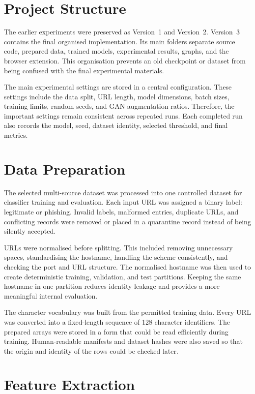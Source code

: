 \section{Project Structure}

The earlier experiments were preserved as Version~1 and Version~2. Version~3
contains the final organised implementation. Its main folders separate source
code, prepared data, trained models, experimental results, graphs, and the
browser extension. This organisation prevents an old checkpoint or dataset
from being confused with the final experimental materials.

The main experimental settings are stored in a central configuration. These
settings include the data split, URL length, model dimensions, batch sizes,
training limits, random seeds, and GAN augmentation ratios. Therefore, the
important settings remain consistent across repeated runs. Each completed run
also records the model, seed, dataset identity, selected threshold, and final
metrics.

\section{Data Preparation}

The selected multi-source dataset was processed into one controlled dataset for
classifier training and evaluation. Each input URL was assigned a binary label:
legitimate or phishing. Invalid labels, malformed entries, duplicate URLs, and
conflicting records were removed or placed in a quarantine record instead of
being silently accepted.

URLs were normalised before splitting. This included removing unnecessary
spaces, standardising the hostname, handling the scheme consistently, and
checking the port and URL structure. The normalised hostname was then used to
create deterministic training, validation, and test partitions. Keeping the
same hostname in one partition reduces identity leakage and provides a more
meaningful internal evaluation.

The character vocabulary was built from the permitted training data. Every URL
was converted into a fixed-length sequence of 128 character identifiers. The
prepared arrays were stored in a form that could be read efficiently during
training. Human-readable manifests and dataset hashes were also saved so that
the origin and identity of the rows could be checked later.

\section{Feature Extraction}

